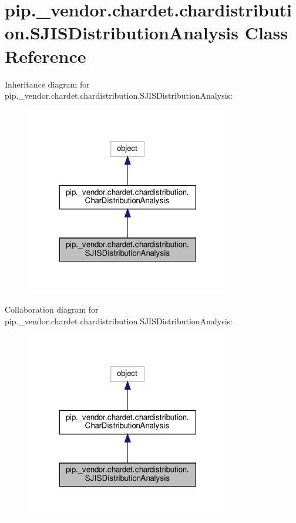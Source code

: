 \hypertarget{classpip_1_1__vendor_1_1chardet_1_1chardistribution_1_1SJISDistributionAnalysis}{}\section{pip.\+\_\+vendor.\+chardet.\+chardistribution.\+S\+J\+I\+S\+Distribution\+Analysis Class Reference}
\label{classpip_1_1__vendor_1_1chardet_1_1chardistribution_1_1SJISDistributionAnalysis}


Inheritance diagram for pip.\+\_\+vendor.\+chardet.\+chardistribution.\+S\+J\+I\+S\+Distribution\+Analysis\+:
\nopagebreak
\begin{figure}[H]
\begin{center}
\leavevmode
\includegraphics[width=254pt]{classpip_1_1__vendor_1_1chardet_1_1chardistribution_1_1SJISDistributionAnalysis__inherit__graph}
\end{center}
\end{figure}


Collaboration diagram for pip.\+\_\+vendor.\+chardet.\+chardistribution.\+S\+J\+I\+S\+Distribution\+Analysis\+:
\nopagebreak
\begin{figure}[H]
\begin{center}
\leavevmode
\includegraphics[width=254pt]{classpip_1_1__vendor_1_1chardet_1_1chardistribution_1_1SJISDistributionAnalysis__coll__graph}
\end{center}
\end{figure}
